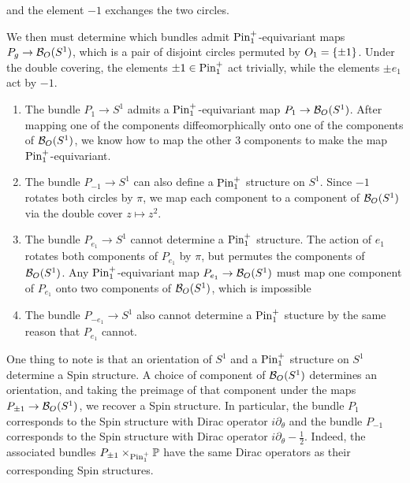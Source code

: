 \begin{exmp}
\begin{enumerate}
  and the element $-1$ exchanges the two
  circles.
\end{enumerate}
%
We then must determine which bundles admit
$\mathrm{Pin}_1^+$-equivariant maps $P_g \to \mathcal{B}_O(S^1)$, which is a pair of disjoint
circles permuted by $O_1 = \left\lbrace \pm 1 \right\rbrace$. Under the double covering, the
elements $\pm 1 \in \mathrm{Pin}_1^+$ act trivially, while the elements $\pm e_1$ act by $-1$.
%
\begin{enumerate}
  \item The bundle $P_1 \to S^1$ admits a $\mathrm{Pin}_1^+$-equivariant map
  $P_1 \to \mathcal{B}_O(S^1)$. After mapping one of the components diffeomorphically
  onto one of the components of $\mathcal{B}_O(S^1)$, we know how to map
  the other $3$ components to make the map $\mathrm{Pin}_1^+$-equivariant.
  \item The bundle $P_{-1} \to S^1$ can also define a $\mathrm{Pin}_1^+$ structure on
  $S^1$. Since $-1$ rotates both circles by $\pi$, we map each component to
  a component of $\mathcal{B}_O(S^1)$ via the double cover $z \mapsto z^2$.
  \item The bundle $P_{e_1} \to S^1$ cannot determine a $\mathrm{Pin}^+_1$ structure.
  The action of $e_1$ rotates both components of $P_{e_1}$ by $\pi$, but
  permutes the components of $\mathcal{B}_O(S^1)$. Any $\mathrm{Pin}_1^+$-equivariant map
  $P_{e_1} \to \mathcal{B}_O(S^1)$ must map one component of $P_{e_1}$ onto two
  components of $\mathcal{B}_O(S^1)$, which is impossible
  \item The bundle $P_{-e_1} \to S^1$ also cannot determine a $\mathrm{Pin}_1^+$
  stucture by the same reason that $P_{e_1}$ cannot.
\end{enumerate}
%
One thing to note is that an orientation of $S^1$ and a $\mathrm{Pin}_1^+$ structure
on $S^1$ determine a Spin structure. A choice of component of $\mathcal{B}_O(S^1)$
determines an orientation, and taking the preimage of that component
under the maps $P_{\pm 1} \to \mathcal{B}_O(S^1)$, we recover a Spin structure. In
particular, the bundle $P_1$ corresponds to the Spin structure with Dirac operator
$i\partial_\theta$ and the bundle $P_{-1}$ corresponds to the Spin structure
with Dirac operator $i\partial_\theta - \frac{1}{2}$.  Indeed, the associated
bundles $P_{\pm 1} \times_{\mathrm{Pin}_1^+} \mathbb{P}$ have the same Dirac operators as
their corresponding Spin structures.\\


\end{exmp}
